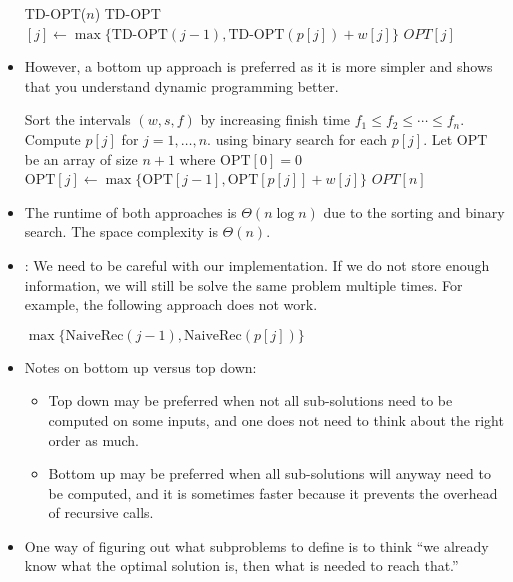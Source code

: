 \documentclass[a4paper,12pt]{article}
\begin{document}
\begin{itemize}
\begin{algorithmic}[1]
        \State\Return TD-OPT($n$)
        \EndProcedure
            \State TD-OPT$[j]\gets\max\{\text{TD-OPT}(j-1),\text{TD-OPT}(p[j])+w[j]\}$
        \EndIf
        \State\Return $OPT[j]$
        \EndProcedure
    \end{algorithmic}
    \item However, a bottom up approach is preferred as it is more simpler and shows that you understand dynamic programming better.
    \begin{algorithmic}[1]
        \State Sort the intervals $(w,s,f)$ by increasing finish time $f_1\leq f_2\leq\cdots\leq f_n.$
        \State Compute $p[j]$ for $j=1,\dots,n.$ using binary search for each $p[j].$
        \State Let $\mathrm{OPT}$ be an array of size $n+1$ where $\mathrm{OPT}[0]=0$
            \State $\mathrm{OPT}[j]\gets\max\{\mathrm{OPT}[j-1],\mathrm{OPT}[p[j]]+w[j]\}$
        \EndFor
        \State \Return $OPT[n]$
        \EndProcedure
    \end{algorithmic}
    \item The runtime of both approaches is $\Theta(n\log n)$ due to the sorting and binary search. The space complexity is $\Theta(n)$.
    \item {}: We need to be careful with our implementation. If we do not store enough information, we will still be solve the same problem multiple times. For example, the following approach does not work. \begin{algorithmic}[1]
            \State {}
        \Else
            \State \Return $\max\{\mathrm{NaiveRec}(j-1),\mathrm{NaiveRec}(p[j])\}$
        \EndIf
        \EndProcedure
    \end{algorithmic}
    \item Notes on bottom up versus top down:
    \begin{itemize}
        \item Top down may be preferred when not all sub-solutions need to be computed on some inputs, and one does not need to think about the right order as much.
        \item Bottom up may be preferred when all sub-solutions will anyway need to be computed, and it is sometimes faster because it prevents the overhead of recursive calls.
    \end{itemize}
    \item One way of figuring out what subproblems to define is to think ``we already know what the optimal solution is, then what is needed to reach that.''

\end{itemize}
\end{document}

